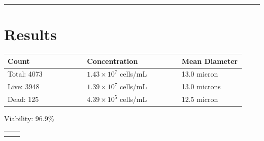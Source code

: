 \documentclass[UTF8,10pt,a4paper,fontset=fandol]{ctexart}
\newcommand{\fieldvalue}[1]{#1}
\begin{document}
\vspace{1em}
\hrule
\vspace{1em}

\section*{Results}

\noindent
\begin{tabular}{@{}p{0.31\linewidth}p{0.37\linewidth}p{0.25\linewidth}@{}}
\textbf{Count} & \textbf{Concentration} & \textbf{Mean Diameter} \\[-0.2em]
\hline
Total:
\fieldvalue{4073}
&
\fieldvalue{$1.43\times10^{7}$ cells/mL}
&
\fieldvalue{13.0 micron}
\\[0.35em]
Live:
\fieldvalue{3948}
&
\fieldvalue{$1.39\times10^{7}$ cells/mL}
&
\fieldvalue{13.0 microns}
\\[0.35em]
Dead:
\fieldvalue{125}
&
\fieldvalue{$4.39\times10^{5}$ cells/mL}
&
\fieldvalue{12.5 micron}
\end{tabular}

\vspace{0.8em}

Viability:
\fieldvalue{96.9\%}

\vspace{1em}

\noindent
\begin{tabular}{@{}p{0.45\linewidth}p{0.45\linewidth}@{}}
\fbox{\rule{0pt}{3.0cm}\rule{0.9\linewidth}{0pt}}
&
\fbox{\rule{0pt}{3.0cm}\rule{0.9\linewidth}{0pt}}
\\[1.5em]
\fbox{\rule{0pt}{3.0cm}\rule{0.9\linewidth}{0pt}}
&
\fbox{\rule{0pt}{3.0cm}\rule{0.9\linewidth}{0pt}}
\end{tabular}
\end{document}
